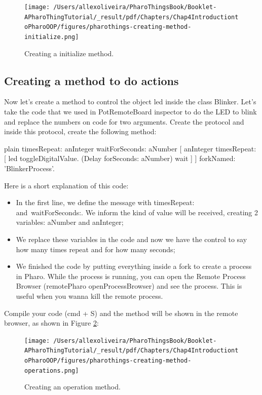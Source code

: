 \documentclass[10pt,twoside,english]{_support/latex/sbabook/sbabook}
\begin{document}
\begin{figure}

\begin{center}
\texttt{[image: /Users/allexoliveira/PharoThingsBook/Booklet-APharoThingTutorial/\_result/pdf/Chapters/Chap4IntroductiontoPharoOOP/figures/pharothings-creating-method-initialize.png]}\caption{Creating a initialize method.\label{InitializeMethod}}\end{center}
\end{figure}

\subsection{Creating a method to do actions}
Now let's create a method to control the object led inside the class Blinker. Let's take the code that we used in PotRemoteBoard inspector to do the LED to blink and replace the numbers on code for two arguments. Create the protocol  and inside this protocol, create the following method:

\begin{displaycode}{plain}
timesRepeat: anInteger waitForSeconds: aNumber
    [ anInteger timesRepeat: [  
        led toggleDigitalValue. 
        (Delay forSeconds: aNumber) wait  
    ] ] forkNamed: 'BlinkerProcess'.
\end{displaycode}

Here is a short explanation of this code:

\begin{itemize}
\item In the first line, we define the message with timesRepeat: and waitForSeconds:. We inform the kind of value will be received, creating 2 variables: aNumber and anInteger;
\item We replace these variables in the code and now we have the control to say how many times repeat and for how many seconds;
\item We finished the code by putting everything inside a fork to create a process in Pharo. While the process is running, you can open the Remote Process Browser (remotePharo openProcessBrowser) and see the process. This is useful when you wanna kill the remote process.
\end{itemize}

Compile your code (cmd + S) and  the method will be shown in the remote browser, as shown in Figure \ref{OperationsMethod}:


\begin{figure}

\begin{center}
\texttt{[image: /Users/allexoliveira/PharoThingsBook/Booklet-APharoThingTutorial/\_result/pdf/Chapters/Chap4IntroductiontoPharoOOP/figures/pharothings-creating-method-operations.png]}\caption{Creating an operation method.\label{OperationsMethod}}\end{center}
\end{figure}
\end{document}
